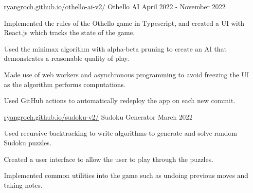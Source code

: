 \begin{cventries}


  \cventry
    {\href{https://ryangroch.github.io/othello-ai-v2/}{ryangroch.github.io/othello-ai-v2/}} %
    {Othello AI} %
    {April 2022 - November 2022} %
    {} %
    {
      \begin{cvitems} %
        \item {Implemented the rules of the Othello game in Typescript, and created a UI with React.js which tracks the state of the game.}
        \item {Used the minimax algorithm with alpha-beta pruning to create an AI that demonstrates a reasonable quality of play.}
        \item {Made use of web workers and asynchronous programming to avoid freezing the UI as the algorithm performs computations.}
        \item {Used GitHub actions to automatically redeploy the app on each new commit.}
      \end{cvitems}
    }

  \cventry
    {\href{https://ryangroch.github.io/sudoku-v2/}{ryangroch.github.io/sudoku-v2/}} %
    {Sudoku Generator} %
    {March 2022} %
    {} %
    {
      \begin{cvitems} %
        \item {Used recursive backtracking to write algorithms to generate and solve random Sudoku puzzles.}
        \item {Created a user interface to allow the user to play through the puzzles.}
        \item {Implemented common utilities into the game such as undoing previous moves and taking notes.}
      \end{cvitems}
    }


\end{cventries}
